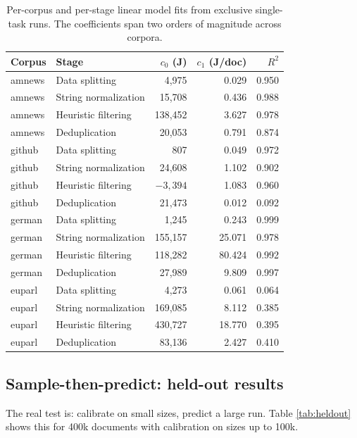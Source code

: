\documentclass[12pt,a4paper]{article}
\begin{document}
\begin{table}[ht]
\centering
\small
\begin{tabular}{llrrr}
\toprule
Corpus & Stage & $c_0$ (J) & $c_1$ (J/doc) & $R^2$ \\
\midrule
amnews & Data splitting & 4,975 & 0.029 & 0.950 \\
amnews & String normalization & 15,708 & 0.436 & 0.988 \\
amnews & Heuristic filtering & 138,452 & 3.627 & 0.978 \\
amnews & Deduplication & 20,053 & 0.791 & 0.874 \\
github & Data splitting & 807 & 0.049 & 0.972 \\
github & String normalization & 24,608 & 1.102 & 0.902 \\
github & Heuristic filtering & $-3,394$ & 1.083 & 0.960 \\
github & Deduplication & 21,473 & 0.012 & 0.092 \\
german & Data splitting & 1,245 & 0.243 & 0.999 \\
german & String normalization & 155,157 & 25.071 & 0.978 \\
german & Heuristic filtering & 118,282 & 80.424 & 0.992 \\
german & Deduplication & 27,989 & 9.809 & 0.997 \\
euparl & Data splitting & 4,273 & 0.061 & 0.064 \\
euparl & String normalization & 169,085 & 8.112 & 0.385 \\
euparl & Heuristic filtering & 430,727 & 18.770 & 0.395 \\
euparl & Deduplication & 83,136 & 2.427 & 0.410 \\
\bottomrule
\end{tabular}
\caption{Per-corpus and per-stage linear model fits from exclusive single-task runs. The coefficients span two orders of magnitude across corpora.}
\label{tab:cal_all}
\end{table}

\subsection{Sample-then-predict: held-out results}

The real test is: calibrate on small sizes, predict a large run. Table \ref{tab:heldout} shows this for 400k documents with calibration on sizes up to 100k.
\end{document}
